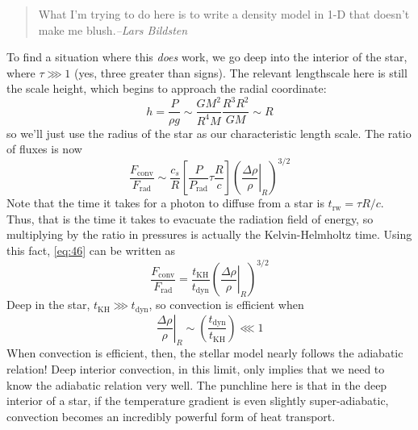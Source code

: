 \documentclass[10pt]{article}
\numberwithin{equation}{section}
\begin{document}
  \begin{quote}
    What I'm trying to do here is to write a density model in 1-D that
    doesn't make me blush.\hfill \emph{--Lars Bildsten}
  \end{quote}
  To find a situation where this \emph{does} work, we go deep into the
  interior of the star, where $\tau \ggg 1$ (yes, three greater than
  signs). The relevant lengthscale here is still the scale height,
  which begins to approach the radial coordinate:
  \begin{equation}
    \label{eq:45}
    h=\frac{P}{\rho g}\sim\frac{GM^2}{R^4M}\frac{R^3R^2}{GM}\sim R
  \end{equation}
  so we'll just use the radius of the star as our characteristic
  length scale. The ratio of fluxes is now 
  \begin{equation}
    \label{eq:46}
    \frac{F_{\mathrm{conv}}}{F_{\mathrm{rad}}}\sim \frac{c_s}{R}\left[\frac
{P}{P_{\mathrm{rad}}}\tau\frac{R}{c}\right]\left(\left.\frac{\Delta\rho}
{\rho}\right|_{R}\right)^{3/2}
  \end{equation}
  Note that the time it takes for a photon to diffuse from a star is
  $t_{\mathrm{rw}}=\tau R/c$. Thus, that is the time it takes to
  evacuate the radiation field of energy, so multiplying by the ratio
  in pressures is actually the Kelvin-Helmholtz time. Using this fact,
  \eqref{eq:46} can be written as
  \begin{equation}
    \label{eq:47}
    \frac{F_{\mathrm{conv}}}{F_{\mathrm{rad}}}=\frac{t_{\mathrm{KH}}}{t_
{\mathrm{dyn}}}\left(\left.\frac{\Delta\rho}{\rho}\right|_{R}\right)^{3/2}
  \end{equation}
  Deep in the star, $t_{\mathrm{KH}}\ggg t_{\mathrm{dyn}}$, so
  convection is efficient when
  \begin{equation}
    \label{eq:48}
    \left.\frac{\Delta\rho}{\rho}\right|_R\sim\left(\frac{t_{\mathrm{dyn}}}
{t_{\mathrm{KH}}}\right)\lll 1
  \end{equation}
  When convection is efficient, then, the stellar model nearly follows
  the adiabatic relation! Deep interior convection, in this limit,
  only implies that we need to know the adiabatic relation very
  well. The punchline here is that in the deep interior of a star, if
  the temperature gradient is even slightly super-adiabatic,
  convection becomes an incredibly powerful form of heat transport.\\
\end{document}
